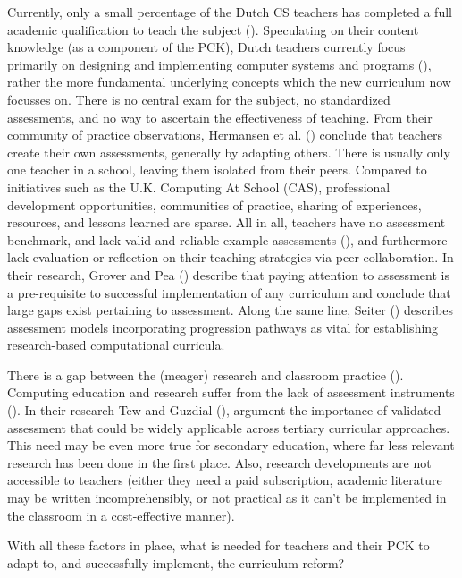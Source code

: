 Currently, only a small percentage of the Dutch CS teachers has completed a full academic qualification to teach the subject (\cite{tolboom2014informatica}). Speculating on their content knowledge (as a component of the PCK), Dutch teachers currently focus primarily on designing and implementing computer systems and programs (\cite{Schmidt2007}), rather the more fundamental underlying concepts which the new curriculum now focusses on. There is no central exam for the subject, no standardized assessments, and no way to ascertain the effectiveness of teaching. From their community of practice observations, Hermansen et al. (\cite{hermansen2014reworking}) conclude that teachers create their own assessments, generally by adapting others. There is usually only one teacher in a school, leaving them isolated from their peers. Compared to initiatives such as the U.K. Computing At School (CAS), professional development opportunities, communities of practice, sharing of experiences, resources, and lessons learned are sparse. All in all, teachers have no assessment benchmark, and lack valid and reliable example assessments (\cite{Yadav2015}), and furthermore lack evaluation or reflection on their teaching strategies via peer-collaboration. In their research, Grover and Pea (\cite{GroverPea2013}) describe that paying attention to assessment is a pre-requisite to successful implementation of any curriculum and conclude that large gaps exist pertaining to assessment. Along the same line, Seiter (\cite{2013Seiter}) describes assessment models incorporating progression pathways as vital for establishing research-based computational curricula.


There is a gap between the (meager) research and classroom practice (\cite{Yadav2015}).  Computing education and research suffer from the lack of assessment instruments (\cite{voogt2017effecten}). In their research Tew and Guzdial (\cite{2010TewGuzdial}), argument the importance of validated assessment that could be widely applicable across tertiary curricular approaches. This need may be even more true for secondary education, where far less relevant research has been done in the first place. Also, research developments are not accessible to teachers (either they need a paid subscription, academic literature may be written incomprehensibly, or not practical as it can't be implemented in the classroom in a cost-effective manner).

With all these factors in place, what is needed for teachers and their PCK to adapt to, and successfully implement, the curriculum reform?





